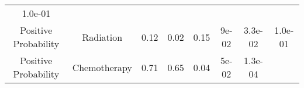 \documentclass[12pt,]{article}
\begin{document}
\begin{longtable}[]{@{}cccccccc@{}}
\begin{minipage}[t]{0.08\columnwidth}
1.0e-01\strut
\end{minipage}\tabularnewline
\begin{minipage}[t]{0.12\columnwidth}\centering\strut
Positive Probability\strut
\end{minipage} & \begin{minipage}[t]{0.11\columnwidth}\centering\strut
Radiation\strut
\end{minipage} & \begin{minipage}[t]{0.13\columnwidth}\centering\strut
0.12\strut
\end{minipage} & \begin{minipage}[t]{0.08\columnwidth}\centering\strut
0.02\strut
\end{minipage} & \begin{minipage}[t]{0.13\columnwidth}\centering\strut
0.15\strut
\end{minipage} & \begin{minipage}[t]{0.07\columnwidth}\centering\strut
9e-02\strut
\end{minipage} & \begin{minipage}[t]{0.06\columnwidth}\centering\strut
3.3e-02\strut
\end{minipage} & \begin{minipage}[t]{0.08\columnwidth}\centering\strut
1.0e-01\strut
\end{minipage}\tabularnewline
\begin{minipage}[t]{0.12\columnwidth}\centering\strut
Positive Probability\strut
\end{minipage} & \begin{minipage}[t]{0.11\columnwidth}\centering\strut
Chemotherapy\strut
\end{minipage} & \begin{minipage}[t]{0.13\columnwidth}\centering\strut
0.71\strut
\end{minipage} & \begin{minipage}[t]{0.08\columnwidth}\centering\strut
0.65\strut
\end{minipage} & \begin{minipage}[t]{0.13\columnwidth}\centering\strut
0.04\strut
\end{minipage} & \begin{minipage}[t]{0.07\columnwidth}\centering\strut
5e-02\strut
\end{minipage} & \begin{minipage}[t]{0.06\columnwidth}\centering\strut
1.3e-04\strut
\end{minipage} & \begin{minipage}[t]{0.08\columnwidth}\centering\strut

\end{minipage}
\end{longtable}
\end{document}
